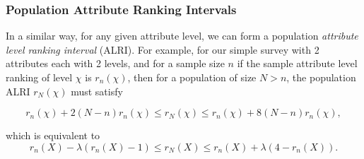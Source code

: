 \documentclass[a4paper, 12pt]{article}
\begin{document}
\subsubsection{Population Attribute Ranking Intervals}
In a similar way, for any given attribute level, we can form a population \emph{attribute level ranking interval} (ALRI). For example, for our simple survey with 2 attributes each with 2 levels, and for a sample size $n$ if the sample attribute level ranking of level $\chi$ is $r_n(\chi)$, then for a population of size $N>n$, the population ALRI   $r_N(\chi)$ must satisfy 

\begin{equation}
r_n(\chi)+2(N-n)r_n(\chi)\le r_N(\chi) \le r_n(\chi)+8(N-n)r_n(\chi),
\end{equation}

{\flushleft which} is equivalent to  
\begin{equation}
r_n(X)-\lambda(r_n(X)-1)\le r_N(X) \le r_n(X) + \lambda(4-r_n(X)).
\label{ALRI}
\end{equation}
\end{document}
